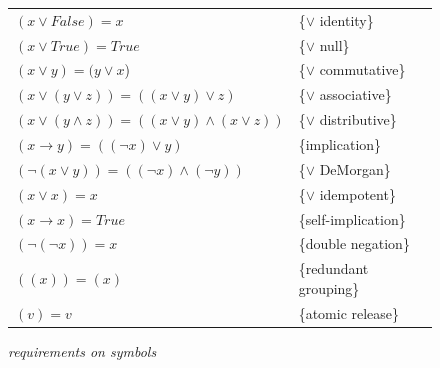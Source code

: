 \begin{figure}
\begin{center}
\begin{spacing}{0.9}
\begin{tabular}{ll}
$(x \vee False) = x$                                     & \{$\vee$ identity\} \\
$(x \vee True) = True$                                   & \{$\vee$ null\} \\
$(x \vee y) = (y \vee x$)                                & \{$\vee$ commutative\} \\
$(x \vee (y \vee z)) = ((x \vee y) \vee z)$              & \{$\vee$ associative\} \\
$(x \vee (y \wedge z)) = ((x \vee y) \wedge (x \vee z))$ & \{$\vee$ distributive\} \\
$(x \rightarrow y) = ((\neg x) \vee y)$                  & \{implication\} \\
$(\neg(x \vee y)) = ((\neg x) \wedge (\neg y))$          & \{$\vee$ DeMorgan\} \\
$(x \vee x) = x$                                         & \{$\vee$ idempotent\} \\
$(x \rightarrow x) = True$                               & \{self-implication\} \\
$(\neg(\neg x))  = x$                                    & \{double negation\} \\
$((x)) = (x)$                                            & \{redundant grouping\} \\
$(v) = v$                                                & \{atomic release\} \\
\end{tabular}

\vspace{2 mm}

\emph{requirements on symbols}


\end{spacing}
\end{center}
\end{figure}
